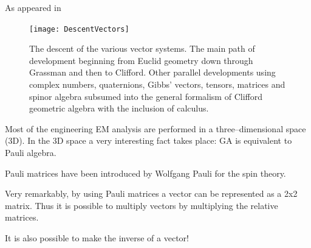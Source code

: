 \documentclass[10pt]{beamer}
\begin{document}
\begin{frame}[shrink=20]{As appeared in \cite{abbott2}}

\begin{center}
\begin{figure}

\texttt{[image: DescentVectors]}

\caption{\label{DescentOfVectors} The descent of the various vector systems. The main path of development beginning from Euclid geometry down through Grassman and then to Clifford. Other parallel developments using complex numbers, quaternions, Gibbs' vectors, tensors, matrices and spinor algebra subsumed into the general formalism of Clifford geometric algebra with the inclusion of calculus.}
\end{figure}
\end{center}

\end{frame}


\begin{frame}[fragile]{}

Most of the engineering EM analysis are performed in a three--dimensional space (3D). 
In the 3D space a very interesting fact takes place: \alert{GA is equivalent to Pauli algebra}.

Pauli matrices have been introduced by Wolfgang Pauli 
for the spin theory.

Very remarkably, \alert{by using Pauli matrices a vector can be represented as a 2x2 matrix}. 
Thus it is possible to multiply vectors by multiplying the relative matrices. 

\alert{It is also possible to make the inverse of a vector!}
\end{frame}

\end{document}
